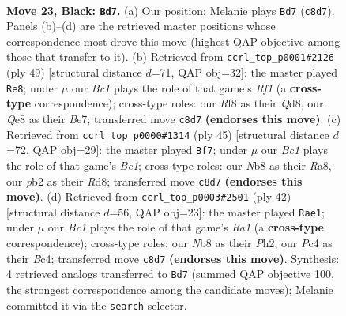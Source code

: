 \documentclass[11pt]{article}
\begin{document}
\clearpage

\begin{figure}[p]\centering
\begin{subfigure}{0.46\textwidth}\centering
\resizebox{\linewidth}{!}{%
\newchessgame
\chessboard[
  setfen={1nb1qrk1/1r3ppp/8/4Pp2/p1p2P2/6K1/PPP3PP/R2Q1BNR b - - 1 23},
  showmover=false,
  pgfstyle=straightmove, color=movearrow, markmove={c8-d7}
]}
\caption{}
\end{subfigure}\hfill
\begin{subfigure}{0.46\textwidth}\centering
\resizebox{\linewidth}{!}{%
\newchessgame
\chessboard[
  setfen={1r1q1rk1/4bp1p/p2p2p1/1p1P2P1/5p1P/P4B2/1PPQ1P2/R4KR1 b - - 1 25},
  showmover=false,
  pgfstyle=straightmove, color=movearrow, markmove={f8-e8}
]}
\caption{}
\end{subfigure}
\\[4pt]
\begin{subfigure}{0.46\textwidth}\centering
\resizebox{\linewidth}{!}{%
\newchessgame
\chessboard[
  setfen={r2rb1k1/4q1pp/p3p3/1p2p1P1/4P3/P3QP1B/1PP5/1K1R3R b - - 2 23},
  showmover=false,
  pgfstyle=straightmove, color=movearrow, markmove={e8-f7}
]}
\caption{}
\end{subfigure}\hfill
\begin{subfigure}{0.46\textwidth}\centering
\resizebox{\linewidth}{!}{%
\newchessgame
\chessboard[
  setfen={r1b2rk1/2q3p1/p2p4/3Ppp2/1PB3p1/P7/2P1QPPP/R4RK1 w - - 0 22},
  showmover=false,
  pgfstyle=straightmove, color=movearrow, markmove={a1-e1}
]}
\caption{}
\end{subfigure}
\caption{\textbf{Move 23, Black: \texttt{Bd7}.} (a) Our position; Melanie plays \texttt{Bd7} (\texttt{c8d7}). Panels (b)--(d) are the retrieved master positions whose correspondence most drove this move (highest QAP objective among those that transfer to it). (b) Retrieved from \texttt{ccrl\_top\_p0001\#2126} (ply 49) [structural distance $d$=71, QAP obj=32]: the master played \texttt{Re8}; under $\mu$ our \emph{Bc1} plays the role of that game's \emph{Rf1} (a \textbf{cross-type} correspondence); cross-type roles: our \emph{R}f8 as their \emph{Q}d8, our \emph{Q}e8 as their \emph{B}e7; transferred move \texttt{c8d7} \textbf{(endorses this move)}. (c) Retrieved from \texttt{ccrl\_top\_p0000\#1314} (ply 45) [structural distance $d$=72, QAP obj=29]: the master played \texttt{Bf7}; under $\mu$ our \emph{Bc1} plays the role of that game's \emph{Be1}; cross-type roles: our \emph{N}b8 as their \emph{R}a8, our \emph{p}b2 as their \emph{R}d8; transferred move \texttt{c8d7} \textbf{(endorses this move)}. (d) Retrieved from \texttt{ccrl\_top\_p0003\#2501} (ply 42) [structural distance $d$=56, QAP obj=23]: the master played \texttt{Rae1}; under $\mu$ our \emph{Bc1} plays the role of that game's \emph{Ra1} (a \textbf{cross-type} correspondence); cross-type roles: our \emph{N}b8 as their \emph{P}h2, our \emph{P}c4 as their \emph{B}c4; transferred move \texttt{c8d7} \textbf{(endorses this move)}. Synthesis: 4 retrieved analogs transferred to \texttt{Bd7} (summed QAP objective 100, the strongest correspondence among the candidate moves); Melanie committed it via the \texttt{search} selector.}
\label{fig:thought-m45}
\end{figure}
\end{document}
